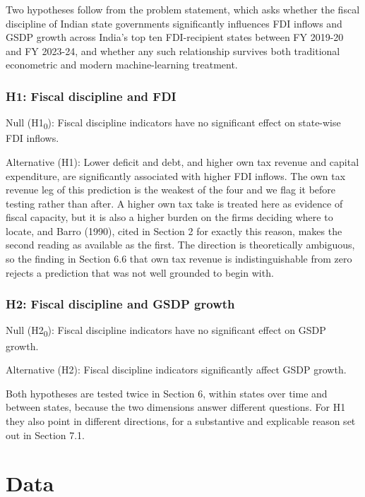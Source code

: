 \documentclass[12pt,a4paper]{article}
\begin{document}
Two hypotheses follow from the problem statement, which asks whether the fiscal discipline of Indian state governments significantly influences FDI inflows and GSDP growth across India's top ten FDI-recipient states between FY 2019-20 and FY 2023-24, and whether any such relationship survives both traditional econometric and modern machine-learning treatment.

\subsubsection*{H1: Fiscal discipline and FDI}

Null (H1\textsubscript{0}): Fiscal discipline indicators have no significant effect on state-wise FDI inflows.

Alternative (H1): Lower deficit and debt, and higher own tax revenue and capital expenditure, are significantly associated with higher FDI inflows. The own tax revenue leg of this prediction is the weakest of the four and we flag it before testing rather than after. A higher own tax take is treated here as evidence of fiscal capacity, but it is also a higher burden on the firms deciding where to locate, and Barro (1990), cited in Section 2 for exactly this reason, makes the second reading as available as the first. The direction is theoretically ambiguous, so the finding in Section 6.6 that own tax revenue is indistinguishable from zero rejects a prediction that was not well grounded to begin with.

\subsubsection*{H2: Fiscal discipline and GSDP growth}

Null (H2\textsubscript{0}): Fiscal discipline indicators have no significant effect on GSDP growth.

Alternative (H2): Fiscal discipline indicators significantly affect GSDP growth.

Both hypotheses are tested twice in Section 6, within states over time and between states, because the two dimensions answer different questions. For H1 they also point in different directions, for a substantive and explicable reason set out in Section 7.1.

\FloatBarrier
\section{Data}
\end{document}
